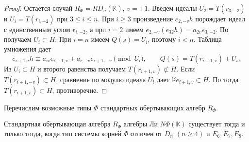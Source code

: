 \documentclass[a4paper,14pt,oneside,openany]{memoir}
\begin{document}
\begin{proof}
    Остается случай $R_\Phi=RD_n(\mathbb{K})$, $v=\pm1$. Введем идеалы
    $U_2=T(r_{3,-2})$ и $U_i=T(r_{i,-2})$ при $3\leq i\leq n$. При $i\geq3$
    произведение $e_{2,-v}h$ порождает идеал с единственным углом $r_{i,-2}$, а при
    $i=2$ имеем $e_{2,-v}(e_{32}h)=a_{2v}e_{3,-2}$. По 
    получаем $U_i\subset H$. При $i=n$ имеем $Q(s)=U_i$, поэтому $i<n$. Таблица
    умножения дает
    \[
        e_{i+1,i}h\equiv
        a_{iv}e_{i+1,v}+a_{i,-v}e_{i+1,-v}\pmod{U_i},\qquad
        Q(s)=T(r_{i+1,v})+U_i.
    \]
    Из $U_i\subset H$ и второго равенства получаем $T(r_{i+1,v})\not\subset H$.
    Если $T(r_{i+1,-v})\subset H$, сравнение по модулю идеала $U_i$ дает
    $\mathbb{K}e_{i+1,v}\subset H$. По  тогда
    $T(r_{i+1,v})\subset H$, противоречие.
\end{proof}

Перечислим возможные типы $\Phi$ стандартных обертывающих алгебр $R_{\Phi}$.

\begin{theorem}\label{th:Exc-Dn-En}
    Стандартная обертывающая алгебра $R_{\Phi}$ алгебры Ли $N\Phi(\mathbb{K})$
    существует тогда и только тогда, когда тип системы корней $\Phi$ отличен от
    $D_n$ $(n\geq4)$ и $E_6,E_7,E_8$.
\end{theorem}
\end{document}
